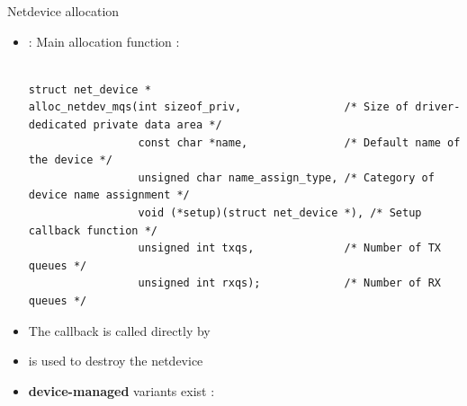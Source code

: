 \begin{frame}[fragile]{Netdevice allocation}
	\begin{itemize}
		\item {} : Main allocation function :
			{\fontsize{8}{7}\selectfont
			\begin{verbatim}

struct net_device *
alloc_netdev_mqs(int sizeof_priv,                /* Size of driver-dedicated private data area */
                 const char *name,               /* Default name of the device */
                 unsigned char name_assign_type, /* Category of device name assignment */
                 void (*setup)(struct net_device *), /* Setup callback function */
                 unsigned int txqs,              /* Number of TX queues */
                 unsigned int rxqs);             /* Number of RX queues */
			\end{verbatim}
			}
		\item The  callback is called directly by 
		\item {} is used to destroy the netdevice
		\item \textbf{device-managed} variants exist : 
	\end{itemize}
\end{frame}


